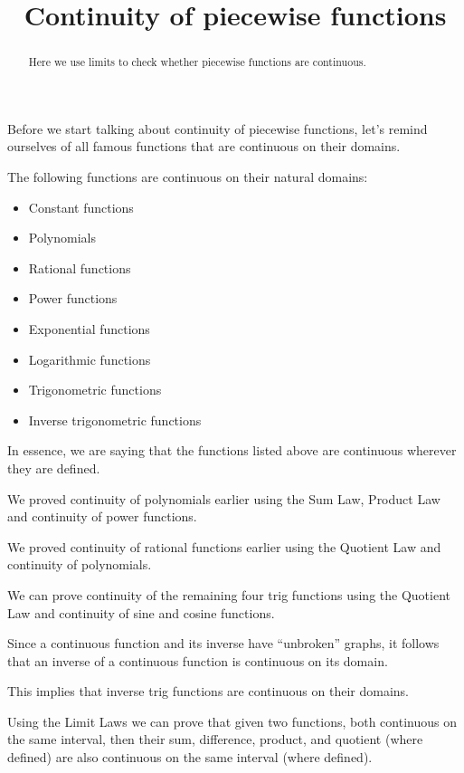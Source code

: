 \documentclass{ximera}
\title[Dig-In:]{Continuity of piecewise functions}
\begin{document}
\begin{abstract}
Here we use limits to check whether piecewise functions are continuous.
\end{abstract}
\maketitle
Before we start talking about continuity of piecewise functions, let's remind ourselves of all famous functions that are continuous on their domains.
\begin{theorem}\label{theorem:continuity}
	The following functions are continuous on their natural domains:
	\begin{itemize}
		\item Constant functions 
		\item Polynomials  
		\item Rational functions  
		\item Power functions 
		\item Exponential functions  
		\item Logarithmic functions  
		\item Trigonometric functions  
		\item Inverse trigonometric functions     
	\end{itemize}
	In essence, we are saying that the functions listed above are
	continuous wherever they are defined.
	
	We proved continuity of polynomials earlier using the Sum Law, Product
	Law and continuity of power functions.
	
	
	We proved continuity of rational functions earlier using the Quotient
	Law and continuity of polynomials.
	
	
	We can prove continuity of the remaining four trig functions using the
	Quotient Law and continuity of sine and cosine functions.
	
	
	Since a continuous function and its inverse have ``unbroken'' graphs,
	it follows that an inverse of a continuous function is continuous on
	its domain.
	
	
	This implies that inverse trig functions are continuous on their domains. 
	
	
	Using the Limit Laws we can prove that given two functions, both
	continuous on the same interval, then their sum, difference, product,
	and quotient (where defined) are also continuous on the same interval
	(where defined).
\end{theorem}
\end{document}
